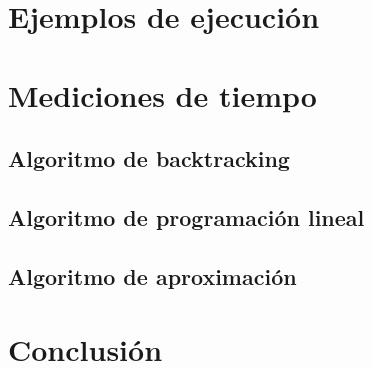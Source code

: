 \documentclass{article}
\begin{document}
\section{Ejemplos de ejecución}
\label{sec:ejemplos}
\section{Mediciones de tiempo}
\label{sec:medTiempo}
\subsection{Algoritmo de backtracking}
\subsection{Algoritmo de programación lineal}
\subsection{Algoritmo de aproximación}


\section{Conclusión}
\end{document}
